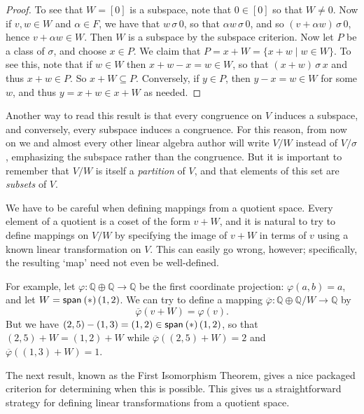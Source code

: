 \documentclass{memoir}
\begin{document}
\begin{proof}
To see that $W = [0]$ is a subspace, note that $0 \in [0]$ so that $W \neq 0$. Now if $v,w \in W$ and $\alpha \in F$, we have that $w \,\sigma\, 0$, so that $\alpha w \,\sigma\, 0$, and so $(v + \alpha w) \,\sigma\, 0$, hence $v + \alpha w \in W$. Then $W$ is a subspace by the subspace criterion. Now let $P$ be a class of $\sigma$, and choose $x \in P$. We claim that $P = x+W = \{ x+w \mid w \in W \}$. To see this, note that if $w \in W$ then $x+w-x = w \in W$, so that $(x+w) \,\sigma\, x$ and thus $x+w \in P$. So $x+W \subseteq P$. Conversely, if $y \in P$, then $y-x = w \in W$ for some $w$, and thus $y = x+w \in x+W$ as needed.
\end{proof}

Another way to read this result is that every congruence on $V$ induces a subspace, and conversely, every subspace induces a congruence. For this reason, from now on we and almost every other linear algebra author will write $V/W$ instead of $V/\sigma$, emphasizing the subspace rather than the congruence. But it is important to remember that $V/W$ is itself a \emph{partition} of $V$, and that elements of this set are \emph{subsets} of $V$.

We have to be careful when defining mappings from a quotient space. Every element of a quotient is a coset of the form $v+W$, and it is natural to try to define mappings on $V/W$ by specifying the image of $v+W$ in terms of $v$ using a known linear transformation on $V$. This can easily go wrong, however; specifically, the resulting `map' need not even be well-defined.

For example, let $\varphi : \mathbb{Q} \oplus \mathbb{Q} \rightarrow \mathbb{Q}$ be the first coordinate projection: $\varphi(a,b) = a$, and let $W = \operatorname{\mathsf{span}}_{}\left(*\right){(1,2)}$. We can try to define a mapping $\overline{\varphi} : \mathbb{Q} \oplus \mathbb{Q} / W \rightarrow \mathbb{Q}$ by \[ \overline{\varphi}(v+W) = \varphi(v). \] But we have $(2,5) - (1,3) = (1,2) \in \operatorname{\mathsf{span}}_{}\left(*\right){(1,2)}$, so that $(2,5)+W = (1,2)+W$ while $\overline{\varphi}((2,5)+W) = 2$ and $\overline{\varphi}((1,3)+W) = 1$.

The next result, known as the First Isomorphism Theorem, gives a nice packaged criterion for determining when this is possible. This gives us a straightforward strategy for defining linear transformations from a quotient space.
\end{document}
